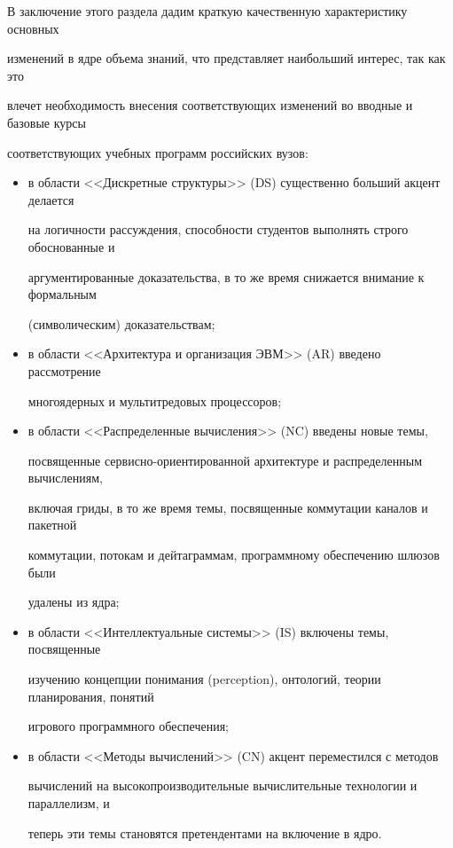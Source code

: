 В заключение этого раздела дадим краткую качественную характеристику основных 

изменений в ядре объема знаний, что представляет наибольший интерес, так как это 

влечет необходимость внесения соответствующих изменений во вводные и базовые курсы 

соответствующих учебных программ российских вузов: 

\begin{itemize}

\item  в области <<Дискретные структуры>> (DS) существенно больший акцент делается 

на логичности рассуждения, способности студентов выполнять строго обоснованные и 

аргументированные доказательства, в то же время снижается внимание к формальным 

(символическим) доказательствам;

\item в области <<Архитектура и организация ЭВМ>> (AR) введено рассмотрение 

многоядерных и мультитредовых процессоров;

\item в области <<Распределенные вычисления>> (NC) введены новые темы, 

посвященные сер\-вис\-но-ори\-ен\-ти\-ро\-ван\-ной архитектуре и распределенным вы\-чис\-ле\-ни\-ям, 

включая гриды, в то же время темы, посвященные коммутации каналов и пакетной 

коммутации, потокам и дейтаграммам, программному обеспечению шлюзов были 

удалены из ядра;

\item в области <<Интеллектуальные системы>> (IS) включены темы, посвященные 

изучению концепции понимания (perception), онтологий, теории планирования, понятий 

игрового программного обеспечения;

\item в области <<Методы вычислений>> (CN) акцент переместился с методов 

вы\-чис\-ле\-ний на высокопроизводительные вычислительные технологии и параллелизм, и 

теперь эти темы становятся претендентами на включение в ядро.

\end{itemize}



